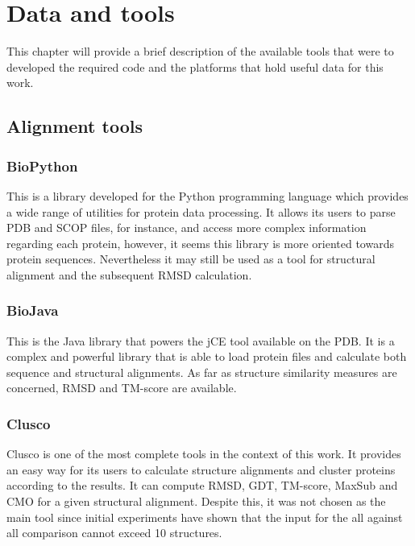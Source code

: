\chapter{Data and tools} 

This chapter will provide a brief description of the available tools that were to developed the required code and the platforms that hold useful data for this work. 

\section{Alignment tools}

\subsection{BioPython}

\cite{cock2009biopython}

This is a library developed for the Python programming language which provides a wide range of utilities for protein data processing. It allows its users to parse PDB and SCOP files, for instance, and access more complex information regarding each protein, however, it seems this library is more oriented towards protein sequences. Nevertheless it may still be used as a tool for structural alignment and the subsequent RMSD calculation.

\subsection{BioJava}

\cite{holland2008biojava}

This is the Java library that powers the jCE tool available on the PDB. It is a complex and powerful library that is able to load protein files and calculate both sequence and structural alignments. As far as structure similarity measures are concerned, RMSD and TM-score are available. 

\subsection{Clusco}

\cite{jamroz2013clusco}

Clusco is one of the most complete tools in the context of this work. It provides an easy way for its users to calculate structure alignments and cluster proteins according to the results. It can compute RMSD, GDT, TM-score, MaxSub and CMO for a given structural alignment. Despite this, it was not chosen as the main tool since initial experiments have shown that the input for the all against all comparison cannot exceed 10 structures.

